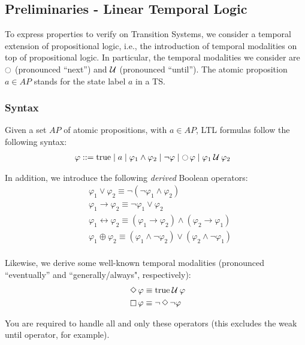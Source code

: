 \documentclass{article}
\begin{document}
\subsection{Preliminaries - Linear Temporal Logic}
\label{subsec-ltl}
To express properties to verify on Transition Systems, we consider a temporal extension of propositional logic, i.e., 
the introduction of temporal modalities on top of propositional logic. In particular, the temporal
modalities we consider are $\ocircle$ (pronounced ``next'') and $\mathbin{\mathcal{U}}$ (pronounced ``until'').
The atomic proposition $a \in AP$ stands for the state label $a$ in a TS.

\subsubsection*{Syntax}
Given a set $AP$ of atomic propositions, with $a \in AP$, LTL formulas follow the following syntax: 
\begin{align*}
    &\; \varphi ::= \text{true} \mid a \mid \varphi_1 \land \varphi_2 \mid \neg \varphi \mid \mathop{\ocircle}{\varphi} \mid \varphi_1 \mathbin{\mathcal{U}} \varphi_2
\end{align*}

In addition, we introduce the following \emph{derived} Boolean operators: 
\begin{align*}
    &\; \varphi_1 \lor \varphi_2 \equiv \neg (\neg \varphi_1 \land \varphi_2) \\
    &\; \varphi_1 \rightarrow \varphi_2 \equiv \neg \varphi_1 \lor \varphi_2 \\
    &\; \varphi_1 \leftrightarrow  \varphi_2 \equiv (\varphi_1 \rightarrow \varphi_2) \land (\varphi_2 \rightarrow \varphi_1) \\
    &\; \varphi_1 \oplus  \varphi_2 \equiv (\varphi_1 \land \neg \varphi_2) \lor (\varphi_2 \land \neg \varphi_1)\\
\end{align*}

Likewise, we derive some well-known temporal modalities (pronounced ``eventually'' and ``generally/always", respectively):
\begin{align*}
    &\; \mathop{\Diamond} \varphi \equiv \text{true} \mathbin{\mathcal{U}} \varphi \\
    &\; \mathop{\square} \varphi \equiv \neg \mathop{\Diamond} \neg \varphi \\
\end{align*}

You are required to handle all and only these operators (this excludes the weak until operator, for example).
\end{document}
